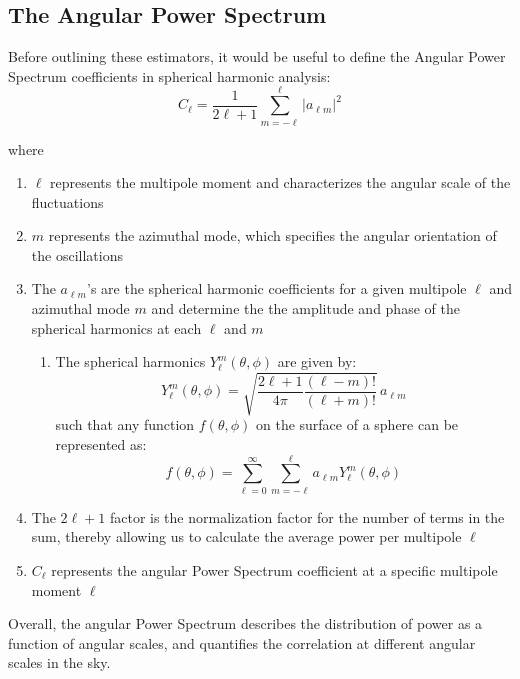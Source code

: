 \documentclass[11pt]{article}
\renewcommand{\_}[1]{\underline{ #1 }}
\newcommand{\tp}{(\theta,\phi)}
\providecommand{\abs}[1]{\lvert #1 \rvert}
\begin{document}
{\subsection{The Angular Power Spectrum}\label{angPS}
Before outlining these estimators, it would be useful to define the Angular Power Spectrum coefficients in spherical harmonic analysis:
\begin{equation}
    C_{\ell} = \frac{1}{2\ell + 1}\sum_{m=-\ell}^{\ell} \abs{a_{\ell m}}^2
\end{equation}

where
\begin{enumerate}
    \item $\ell$ represents the multipole moment and characterizes the angular scale of the fluctuations
    \item $m$ represents the azimuthal mode, which specifies the angular orientation of the oscillations
    \item The $a_{\ell m}$'s are the spherical harmonic coefficients for a given multipole $\ell$ and azimuthal mode $m$ and determine the the amplitude and phase of the spherical harmonics at each $\ell$ and $m$
    \begin{enumerate}
        \item The spherical harmonics $Y_{\ell}^m \tp$ are given by:
        \begin{equation}
            Y_{\ell}^m \tp = \sqrt{\frac{2\ell + 1}{4\pi} \frac{(\ell - m)!}{(\ell + m)!}} \, a_{\ell m}
        \end{equation}
        such that any function $f\tp$ on the surface of a sphere can be represented as:
        \begin{equation}
            f\tp = \sum_{\ell = 0}^{\infty}\sum_{m = -\ell}^{\ell} a_{\ell m}Y_{\ell}^m\tp
        \end{equation}
    \end{enumerate}
    \item The $2\ell + 1$ factor is the normalization factor for the number of terms in the sum, thereby allowing us to calculate the average power per multipole $\ell$
    \item $C_{\ell}$ represents the angular Power Spectrum coefficient at a specific multipole moment $\ell$
\end{enumerate}

Overall, the angular Power Spectrum describes the distribution of power as a function of angular scales, and quantifies the correlation at different angular scales in the sky.

}
\end{document}
